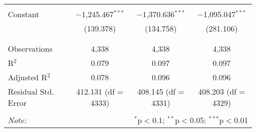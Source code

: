 \begin{table}[!htbp]
\begin{tabular}{@{\extracolsep{5pt}}lccc}
  & & & \\ 
 Constant & $-$1,245.467$^{***}$ & $-$1,370.636$^{***}$ & $-$1,095.047$^{***}$ \\ 
  & (139.378) & (134.758) & (281.106) \\ 
  & & & \\ 
\hline \\[-1.8ex] 
Observations & 4,338 & 4,338 & 4,338 \\ 
R$^{2}$ & 0.079 & 0.097 & 0.097 \\ 
Adjusted R$^{2}$ & 0.078 & 0.096 & 0.096 \\ 
Residual Std. Error & 412.131 (df = 4333) & 408.145 (df = 4331) & 408.203 (df = 4329) \\ 
\hline 
\hline \\[-1.8ex] 
\textit{Note:}  & \multicolumn{3}{r}{$^{*}$p$<$0.1; $^{**}$p$<$0.05; $^{***}$p$<$0.01} \\ 
\end{tabular} 
\end{table} 
